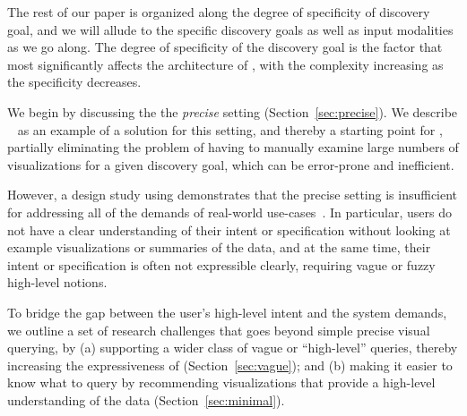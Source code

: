 \par
{}
The rest of our paper is organized along the degree of specificity
of discovery goal, and we will allude to the specific discovery
goals as well as input modalities as we go along. 
The degree of specificity of the discovery goal is the factor
that most significantly affects the architecture of \vida,
with the complexity increasing as the specificity decreases. 

\par We begin by discussing the 
the {\em precise} setting (Section~\ref{sec:precise}).
We describe \zv~\cite{Siddiqui2016} 
as an example of a solution for
this setting, and thereby a starting point for \vida,
partially eliminating the problem
of having to manually examine large numbers 
of visualizations for a given discovery goal, 
which can be error-prone and inefficient.


\par However, a design study using \zv demonstrates
that the precise setting is insufficient for
addressing all of the demands of real-world use-cases~\cite{Lee2017}.
In particular, users do not have
a clear understanding of their intent or specification 
without looking
at example visualizations or summaries of the data,
and at the same time, their intent or specification is
often not expressible clearly, requiring 
vague or fuzzy high-level notions.

To bridge the gap between the user's high-level
intent and the system demands,
we outline a set of research challenges
that goes beyond simple precise visual querying, by
(a) supporting a wider class of vague or ``high-level''
queries, thereby increasing the expressiveness
of \vida (Section~\ref{sec:vague});
and 
(b) making it easier to know what to query
by recommending visualizations that provide
a high-level understanding of the data (Section~\ref{sec:minimal}).



